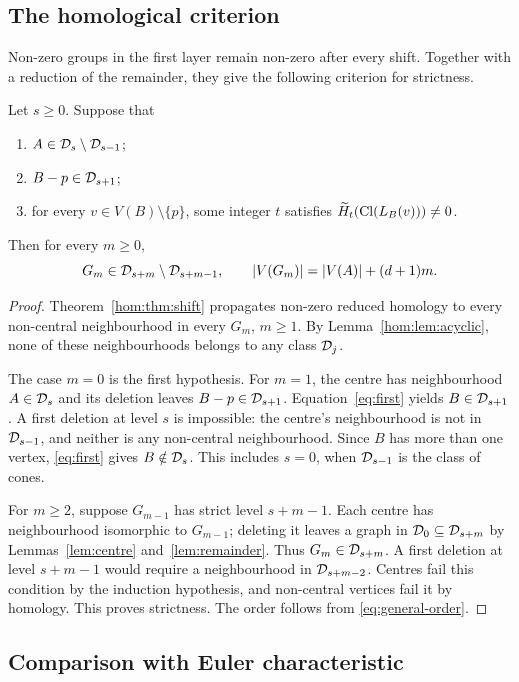 \subsection{The homological criterion}

Non-zero groups in the first layer remain non-zero after every shift. Together with a reduction of the remainder, they give the following criterion for strictness.

\begin{theorem}\label{hom:thm:criterion}
Let \(s\geq0\). Suppose that
\begin{enumerate}
\item \(A\in\mathcal D_s\setminus\mathcal D_{s-1}\);
\item \(B-p\in\mathcal D_{s+1}\);
\item for every \(v\in V(B)\setminus\{p\}\), some integer \(t\)
satisfies \(\widetilde H_t(\operatorname{Cl}(L_B(v)))\ne0\).
\end{enumerate}
Then for every \(m\geq0\),
\[
 G_m\in\mathcal D_{s+m}\setminus\mathcal D_{s+m-1},
 \qquad |V(G_m)|=|V(A)|+(d+1)m.
\]
\end{theorem}
\begin{proof}
Theorem~\ref{hom:thm:shift} propagates non-zero reduced homology to
every non-central neighbourhood in every \(G_m\), \(m\geq1\).
By Lemma~\ref{hom:lem:acyclic}, none of these neighbourhoods belongs
to any class \(\mathcal D_j\).

The case \(m=0\) is the first hypothesis. For \(m=1\), the centre
has neighbourhood \(A\in\mathcal D_s\) and its deletion leaves
\(B-p\in\mathcal D_{s+1}\). Equation~\eqref{eq:first} yields
\(B\in\mathcal D_{s+1}\). A first deletion at level \(s\) is impossible:
the centre's neighbourhood is not in \(\mathcal D_{s-1}\), and neither is
any non-central neighbourhood. Since \(B\) has more than one
vertex, \eqref{eq:first} gives \(B\notin\mathcal D_s\).
This includes \(s=0\), when \(\mathcal D_{s-1}\) is the class of cones.

For \(m\geq2\), suppose \(G_{m-1}\) has strict level
\(s+m-1\). Each centre has neighbourhood isomorphic
to \(G_{m-1}\); deleting it leaves a graph in
\(\mathcal D_0\subseteq\mathcal D_{s+m}\) by Lemmas~\ref{lem:centre} and~\ref{lem:remainder}.
Thus \(G_m\in\mathcal D_{s+m}\). A first deletion at level \(s+m-1\)
would require a neighbourhood in \(\mathcal D_{s+m-2}\).
Centres fail this condition by the induction hypothesis, and
non-central vertices fail it by homology. This proves strictness.
The order follows from \eqref{eq:general-order}.
\end{proof}

\subsection{Comparison with Euler characteristic}

